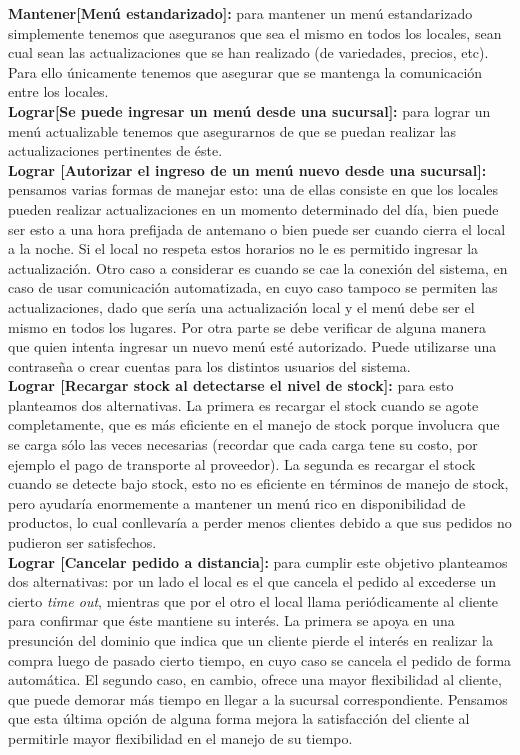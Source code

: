 \documentclass[a4paper,10pt]{article}
\begin{document}
\textbf{Mantener[Menú estandarizado]:} para mantener un menú estandarizado simplemente tenemos que aseguranos que sea el mismo en todos los locales, sean cual sean las actualizaciones que se han realizado (de variedades, precios, etc). Para ello únicamente tenemos que asegurar que se mantenga la comunicación entre los locales. \\
\textbf{Lograr[Se puede ingresar un menú desde una sucursal]:} para lograr un menú actualizable tenemos que asegurarnos de que se puedan realizar las actualizaciones pertinentes de éste. \\
\textbf{Lograr [Autorizar el ingreso de un menú nuevo desde una sucursal]:} pensamos varias formas de manejar esto: una de ellas consiste en que los locales pueden realizar actualizaciones en un momento determinado del día, bien puede ser esto a una hora prefijada de antemano o bien puede ser cuando cierra el local a la noche. Si el local no respeta estos horarios no le es permitido ingresar la actualización. Otro caso a considerar es cuando se cae la conexión del sistema, en caso de usar comunicación automatizada, en cuyo caso tampoco se permiten las actualizaciones, dado que sería una actualización local y el menú debe ser el mismo en todos los lugares. Por otra parte se debe verificar de alguna manera que quien intenta ingresar un nuevo menú esté autorizado. Puede utilizarse una contraseña o crear cuentas para los distintos usuarios del sistema. \\
\textbf{Lograr [Recargar stock al detectarse el nivel de stock]:} para esto planteamos dos alternativas. La primera es recargar el stock cuando se agote completamente, que es más eficiente en el manejo de stock porque involucra que se carga sólo las veces necesarias (recordar que cada carga tene su costo, por ejemplo el pago de transporte al proveedor). La segunda es recargar el stock cuando se detecte bajo stock, esto no es eficiente en términos de manejo de stock, pero ayudaría enormemente a mantener un menú rico en disponibilidad de productos, lo cual conllevaría a perder menos clientes debido a que sus pedidos no pudieron ser satisfechos.\\
\textbf{Lograr [Cancelar pedido a distancia]:} para cumplir este objetivo planteamos dos alternativas: por un lado el local es el que cancela el pedido al excederse un cierto \textit{time out}, mientras que por el otro el local llama periódicamente al cliente para confirmar que éste mantiene su interés. La primera se apoya en una presunción del dominio que indica que un cliente pierde el interés en realizar la compra luego de pasado cierto tiempo, en cuyo caso se cancela el pedido de forma automática. El segundo caso, en cambio, ofrece una mayor flexibilidad al cliente, que puede demorar más tiempo en llegar a la sucursal correspondiente. Pensamos que esta última opción de alguna forma mejora la satisfacción del cliente al permitirle mayor flexibilidad en el manejo de su tiempo.\\
\end{document}
